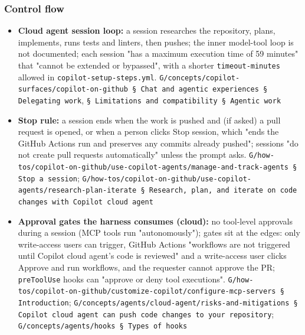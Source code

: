\subsubsection*{Control flow}
\begin{itemize}
\item \textbf{Cloud agent session loop:} a session researches the repository, plans, implements, runs tests and linters, then pushes; the inner model-tool loop is not documented; each session "has a maximum execution time of 59 minutes" that "cannot be extended or bypassed", with a shorter \texttt{timeout-\allowbreak{}minutes} allowed in \texttt{copilot-\allowbreak{}setup-\allowbreak{}steps.\allowbreak{}yml}. \texttt{G/\allowbreak{}concepts/\allowbreak{}copilot-\allowbreak{}surfaces/\allowbreak{}copilot-\allowbreak{}on-\allowbreak{}github § Chat and agentic experiences § Delegating work}, \texttt{§ Limitations and compatibility § Agentic work}
\item \textbf{Stop rule:} a session ends when the work is pushed and (if asked) a pull request is opened, or when a person clicks Stop session, which "ends the GitHub Actions run and preserves any commits already pushed"; sessions "do not create pull requests automatically" unless the prompt asks. \texttt{G/\allowbreak{}how-\allowbreak{}tos/\allowbreak{}copilot-\allowbreak{}on-\allowbreak{}github/\allowbreak{}use-\allowbreak{}copilot-\allowbreak{}agents/\allowbreak{}manage-\allowbreak{}and-\allowbreak{}track-\allowbreak{}agents § Stop a session}; \texttt{G/\allowbreak{}how-\allowbreak{}tos/\allowbreak{}copilot-\allowbreak{}on-\allowbreak{}github/\allowbreak{}use-\allowbreak{}copilot-\allowbreak{}agents/\allowbreak{}research-\allowbreak{}plan-\allowbreak{}iterate § Research, plan, and iterate on code changes with Copilot cloud agent}
\item \textbf{Approval gates the harness consumes (cloud):} no tool-level approvals during a session (MCP tools run "autonomously"); gates sit at the edges: only write-access users can trigger, GitHub Actions "workflows are not triggered until Copilot cloud agent's code is reviewed" and a write-access user clicks Approve and run workflows, and the requester cannot approve the PR; \texttt{preToolUse} hooks can "approve or deny tool executions". \texttt{G/\allowbreak{}how-\allowbreak{}tos/\allowbreak{}copilot-\allowbreak{}on-\allowbreak{}github/\allowbreak{}customize-\allowbreak{}copilot/\allowbreak{}configure-\allowbreak{}mcp-\allowbreak{}servers § Introduction}; \texttt{G/\allowbreak{}concepts/\allowbreak{}agents/\allowbreak{}cloud-\allowbreak{}agent/\allowbreak{}risks-\allowbreak{}and-\allowbreak{}mitigations § Copilot cloud agent can push code changes to your repository}; \texttt{G/\allowbreak{}concepts/\allowbreak{}agents/\allowbreak{}hooks § Types of hooks}

\end{itemize}
